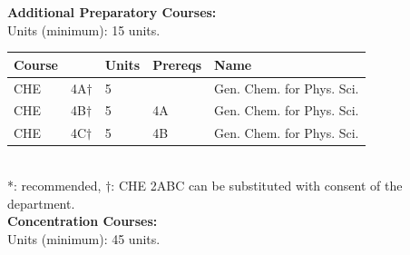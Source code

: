 \documentclass[12pt]{article}
\begin{document}
\newpage
{}
\vskip 0.25cm
\noindent
{\bf Additional Preparatory Courses:  }\\
Units (minimum):  15 units.\\
\begin{tabular}{|lllll|}
\hline
Course & & Units & Prereqs & Name \\
\hline
CHE & 4A$\dagger$ & 5 &        & Gen. Chem. for Phys. Sci.\\
CHE & 4B$\dagger$ & 5 & 4A & Gen. Chem. for Phys. Sci.\\
CHE & 4C$\dagger$ & 5 & 4B & Gen. Chem. for Phys. Sci.\\
\hline
\end{tabular}\\
\noindent
*: recommended, $\dagger$: CHE 2ABC can be substituted with consent of the department.\\
\noindent
{\bf Concentration Courses:  }\\
Units (minimum):  45 units.\\
\end{document}
